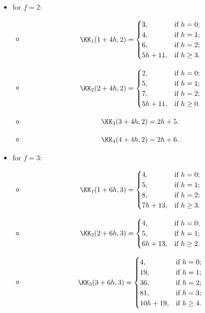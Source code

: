 \begin{definition}
\begin{itemize}
\begin{itemize}
\begin{itemize}
$$\begin{cases}
0,&\text{if\ } h=0;\\
1,&\text{if\ } h\geq 1.
\end{cases}$$
\end{itemize}
\item[$\bullet$] for $f=2$:
\begin{itemize}
\item[] $$\KK_{1}(1+4h,2)=
\begin{cases}
3,&\text{if\ } h=0;\\
4,&\text{if\ } h=1;\\
6,&\text{if\ } h=2;\\
5h+11,&\text{if\ } h\geq 3.
\end{cases}$$
\item[] $$\KK_{2}(2+4h,2)=
\begin{cases}
2,&\text{if\ } h=0;\\
5,&\text{if\ } h=1;\\
7,&\text{if\ } h=2;\\
5h+11,&\text{if\ } h\geq 0.
\end{cases}$$
\item[] $$\KK_{3}(3+4h,2)=2h+5.$$
\item[] $$\KK_{4}(4+4h,2)=2h+6.$$
\end{itemize}
\item[$\bullet$] for $f=3$:
\begin{itemize}
\item[] $$\KK_{1}(1+6h,3)=
\begin{cases}
4,&\text{if\ } h=0;\\
5,&\text{if\ } h=1;\\
8,&\text{if\ } h=2;\\
7h+13,&\text{if\ } h\geq 3.
\end{cases}$$
\item[] $$\KK_{2}(2+6h,3)=
\begin{cases}
4,&\text{if\ } h=0;\\
5,&\text{if\ } h=1;\\
6h+13,&\text{if\ } h\geq 2.
\end{cases}$$
\item[] $$\KK_{3}(3+6h,3)=
\begin{cases}
4,&\text{if\ } h=0;\\
19,&\text{if\ } h=1;\\
36,&\text{if\ } h=2;\\
81,&\text{if\ } h=3;\\
10h+19,&\text{if\ } h\geq 4.
\end{cases}$$

\end{itemize}
\end{itemize}
\end{itemize}
\end{definition}
